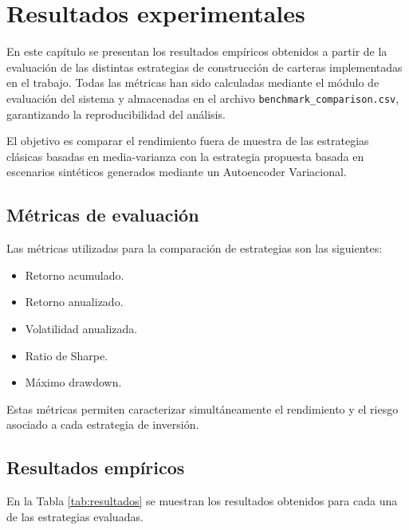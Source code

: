 \section{Resultados experimentales}

En este capítulo se presentan los resultados empíricos obtenidos a partir de la evaluación de las distintas estrategias de construcción de carteras implementadas en el trabajo. Todas las métricas han sido calculadas mediante el módulo de evaluación del sistema y almacenadas en el archivo \texttt{benchmark\_comparison.csv}, garantizando la reproducibilidad del análisis.

El objetivo es comparar el rendimiento fuera de muestra de las estrategias clásicas basadas en media-varianza con la estrategia propuesta basada en escenarios sintéticos generados mediante un Autoencoder Variacional.

\subsection{Métricas de evaluación}

Las métricas utilizadas para la comparación de estrategias son las siguientes:

\begin{itemize}
\item Retorno acumulado.
\item Retorno anualizado.
\item Volatilidad anualizada.
\item Ratio de Sharpe.
\item Máximo drawdown.
\end{itemize}

Estas métricas permiten caracterizar simultáneamente el rendimiento y el riesgo asociado a cada estrategia de inversión.

\subsection{Resultados empíricos}

En la Tabla \ref{tab:resultados} se muestran los resultados obtenidos para cada una de las estrategias evaluadas.

